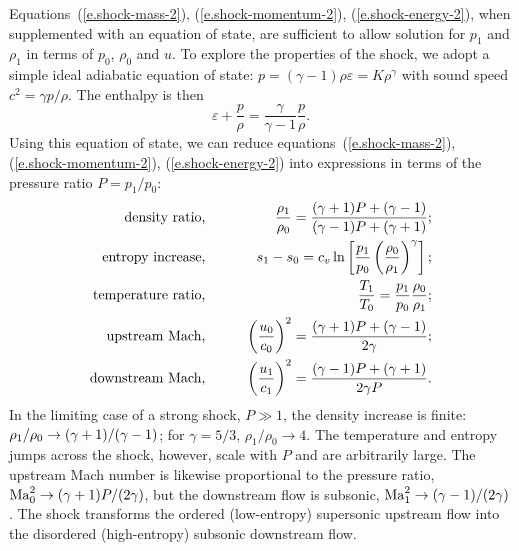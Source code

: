 Equations~(\ref{e.shock-mass-2}), (\ref{e.shock-momentum-2}), (\ref{e.shock-energy-2}), when supplemented with an equation of state, are sufficient to allow solution for $p_{1}$ and $\rho_{1}$ in terms of $p_{0}$, $\rho_{0}$ and $u$. To explore the properties of the shock, we adopt a simple ideal adiabatic equation of state: $p =  (\gamma - 1)\rho\varepsilon = K \rho^{\gamma}$ with sound speed $c^{2} = \gamma p/\rho$.  The enthalpy is then
\[ \varepsilon + \frac{p}{\rho} = \frac{\gamma}{\gamma-1}\frac{p}{\rho}. \]
Using this equation of state, we can reduce equations~(\ref{e.shock-mass-2}), (\ref{e.shock-momentum-2}), (\ref{e.shock-energy-2}) into expressions in terms of the pressure ratio $P = p_{1}/p_{0}$:
\begin{eqnarray}
	\textrm{density ratio,}&\qquad& \frac{\rho_{1}}{\rho_{0}} 
			= \frac{(\gamma+1) P + (\gamma-1)}{(\gamma-1) P +  (\gamma+1)};\\
	\textrm{entropy increase,} &\qquad& s_{1}-s_{0} 
		= c_{v}\ln\left[\frac{p_{1}}{p_{0}}\left(\frac{\rho_{0}}{\rho_{1}}\right)^{\gamma}\right];\\
	\textrm{temperature ratio,} &\qquad& \frac{T_{1}}{T_{0}} = \frac{p_{1}}{p_{0}}\frac{\rho_{0}}{\rho_{1}};\\
	\textrm{upstream Mach,} &\qquad& \left(\frac{u_{0}}{c_{0}}\right)^{2} = \frac{(\gamma+1) P + (\gamma-1)}{2\gamma};\\
	\textrm{downstream Mach,} &\qquad& \left(\frac{u_{1}}{c_{1}}\right)^{2} 
			= \frac{(\gamma-1) P + (\gamma+1)}{2\gamma P}.
\end{eqnarray}
In the limiting case of a strong shock, $P \gg 1$, the density increase is finite: $\rho_{1}/\rho_{0} \to (\gamma+1)/(\gamma-1)$; for $\gamma = 5/3$, $\rho_{1}/\rho_{0}\to 4$.  The temperature and entropy jumps across the shock, however, scale with $P$ and are arbitrarily large.  The upstream Mach number is likewise proportional to the pressure ratio, $\mathrm{Ma}_{0}^{2} \to (\gamma+1) P/(2\gamma)$, but the downstream flow is subsonic, $\mathrm{Ma}_{1}^{2} \to (\gamma-1)/(2\gamma)$. The shock transforms the ordered (low-entropy) supersonic upstream flow into the disordered (high-entropy) subsonic downstream flow.
